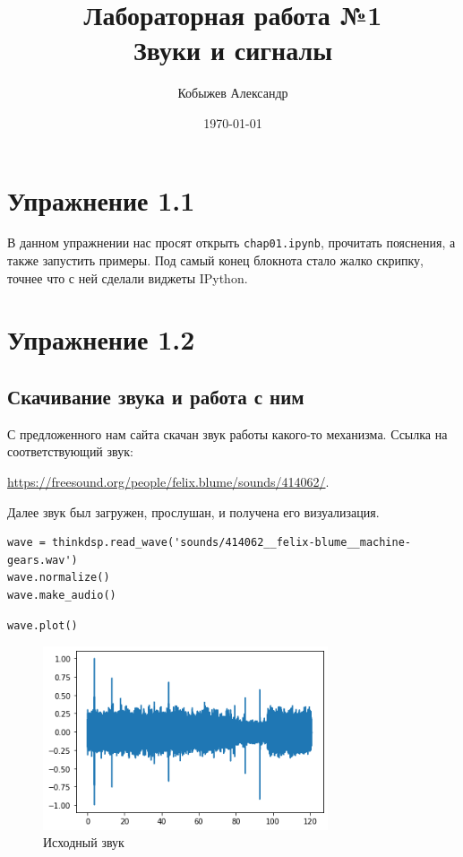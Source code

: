 \documentclass[a4paper,12pt]{report}
\title{Лабораторная работа №1\\Звуки и сигналы}
\author{Кобыжев Александр}
\date{\today}
\begin{document}
\maketitle
\tableofcontents
\listoffigures
\lstlistoflistings

\maketitle

\chapter{Упражнение 1.1}

В данном упражнении нас просят открыть \texttt{chap01.ipynb}, прочитать пояснения, а также запустить примеры. Под самый конец блокнота стало жалко скрипку, точнее что с ней сделали виджеты IPython.

\chapter{Упражнение 1.2}
\section{Скачивание звука и работа с ним}

С предложенного нам сайта скачан звук работы какого-то механизма. Ссылка на соответствующий звук:

\href{https://freesound.org/people/felix.blume/sounds/414062/}{https://freesound.org/people/felix.blume/sounds/414062/}.

Далее звук был загружен, прослушан, и получена его визуализация.

\begin{lstlisting}[caption=Загрузка и прослушивание звука]
wave = thinkdsp.read_wave('sounds/414062__felix-blume__machine-gears.wav')
wave.normalize()
wave.make_audio()
\end{lstlisting}

\begin{lstlisting}[caption=Визуализация звука]
wave.plot()
\end{lstlisting}

\begin{figure}[H]
        \centering
        \includegraphics[width=0.75\textwidth]{lab1_fig2_1.png}
        \caption{Исходный звук}
        \label{fig:lab1_fig2_1}
\end{figure}
    
\end{document}
